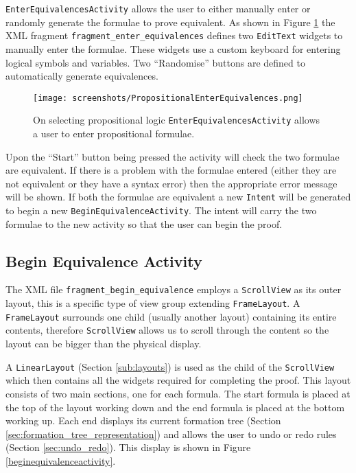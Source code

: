 \documentclass[draft]{report}
\begin{document}
{\tt EnterEquivalencesActivity} allows the user to either manually enter or randomly generate the formulae to prove equivalent. As shown in Figure \ref{propositionalenterequivalences} the XML fragment {\tt fragment\_enter\_equivalences} defines two {\tt EditText} widgets to manually enter the formulae. These widgets use a custom keyboard for entering logical symbols and variables. Two ``Randomise'' buttons are defined to automatically generate equivalences.

\begin{figure}[ht!]
    \centering
    \texttt{[image: screenshots/PropositionalEnterEquivalences.png]}
    \caption{On selecting propositional logic {\tt EnterEquivalencesActivity} allows a user to enter propositional formulae.}
    \label{propositionalenterequivalences}
\end{figure}

Upon the ``Start'' button being pressed the activity will check the two formulae are equivalent. If there is a problem with the formulae entered (either they are not equivalent or they have a syntax error) then the appropriate error message will be shown. If both the formulae are equivalent a new {\tt Intent} will be generated to begin a new {\tt BeginEquivalenceActivity}. The intent will carry the two formulae to the new activity so that the user can begin the proof.

\subsection{Begin Equivalence Activity}

The XML file {\tt fragment\_begin\_equivalence} employs a {\tt ScrollView} as its outer layout, this is a specific type of view group extending {\tt FrameLayout}. A {\tt FrameLayout} surrounds one child (usually another layout) containing its entire contents, therefore {\tt ScrollView} allows us to scroll through the content so the layout can be bigger than the physical display. 

A {\tt LinearLayout} (Section \ref{sub:layouts}) is used as the child of the {\tt ScrollView} which then contains all the widgets required for completing the proof. This layout consists of two main sections, one for each formula. The start formula is placed at the top of the layout working down and the end formula is placed at the bottom working up. Each end displays its current formation tree (Section \ref{sec:formation_tree_representation}) and allows the user to undo or redo rules (Section \ref{sec:undo_redo}). This display is shown in Figure \ref{beginequivalenceactivity}.
\end{document}
